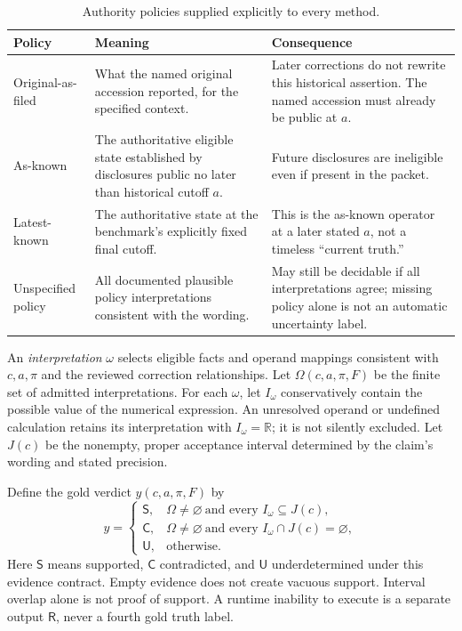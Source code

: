 \documentclass[11pt,a4paper]{article}
\newcommand{\Slabel}{\mathsf{S}}
\newcommand{\Clabel}{\mathsf{C}}
\newcommand{\Ulabel}{\mathsf{U}}
\newcommand{\Rlabel}{\mathsf{R}}
\begin{document}
\begin{table}[H]\caption{Authority policies supplied explicitly to every method.}
\small\begin{tabularx}{\linewidth}{p{.22\linewidth}YY}\toprule
Policy & Meaning & Consequence\\\midrule
Original-as-filed & What the named original accession reported, for the specified context. & Later corrections do not rewrite this historical assertion. The named accession must already be public at $a$.\\
As-known & The authoritative eligible state established by disclosures public no later than historical cutoff $a$. & Future disclosures are ineligible even if present in the packet.\\
Latest-known & The authoritative state at the benchmark's explicitly fixed final cutoff. & This is the as-known operator at a later stated $a$, not a timeless “current truth.”\\
Unspecified policy & All documented plausible policy interpretations consistent with the wording. & May still be decidable if all interpretations agree; missing policy alone is not an automatic uncertainty label.\\\bottomrule
\end{tabularx}\end{table}

An \emph{interpretation} $\omega$ selects eligible facts and operand mappings consistent with $c,a,\pi$ and the reviewed correction relationships. Let $\Omega(c,a,\pi,F)$ be the finite set of admitted interpretations. For each $\omega$, let $I_\omega$ conservatively contain the possible value of the numerical expression. An unresolved operand or undefined calculation retains its interpretation with $I_\omega=\mathbb R$; it is not silently excluded. Let $J(c)$ be the nonempty, proper acceptance interval determined by the claim's wording and stated precision.

Define the gold verdict $y(c,a,\pi,F)$ by
\[
y=\begin{cases}
\Slabel,&\Omega\ne\varnothing\ \text{and every }I_\omega\subseteq J(c),\\
\Clabel,&\Omega\ne\varnothing\ \text{and every }I_\omega\cap J(c)=\varnothing,\\
\Ulabel,&\text{otherwise.}
\end{cases}
\]
Here $\Slabel$ means supported, $\Clabel$ contradicted, and $\Ulabel$ underdetermined under this evidence contract. Empty evidence does not create vacuous support. Interval overlap alone is not proof of support. A runtime inability to execute is a separate output $\Rlabel$, never a fourth gold truth label.
\end{document}
